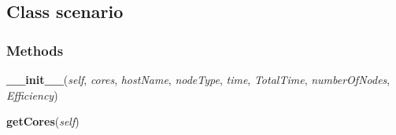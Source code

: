 
\subsection{Class scenario}

    \label{scenarios:scenario}


  \subsubsection{Methods}

    \label{scenarios:scenario:__init__}

    \vspace{0.5ex}

\hspace{.8\funcindent}\begin{boxedminipage}{\funcwidth}

    \raggedright \textbf{\_\_init\_\_}(\textit{self}, \textit{cores}, \textit{hostName}, \textit{nodeType}, \textit{time}, \textit{TotalTime}, \textit{numberOfNodes}, \textit{Efficiency})

\setlength{\parskip}{2ex}
\setlength{\parskip}{1ex}
    \end{boxedminipage}

    \label{scenarios:scenario:getCores}

    \vspace{0.5ex}

\hspace{.8\funcindent}\begin{boxedminipage}{\funcwidth}

    \raggedright \textbf{getCores}(\textit{self})

\setlength{\parskip}{2ex}
\setlength{\parskip}{1ex}
    \end{boxedminipage}

